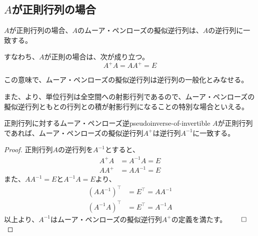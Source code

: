 \documentclass[../../../topic_linear-algebra]{subfiles}
\begin{document}
\subsection{$A$が正則行列の場合}

$A$が正則行列の場合、$A$のムーア・ペンローズの擬似逆行列は、$A$の逆行列に一致する。

すなわち、$A$が正則の場合は、次が成り立つ。
\begin{equation*}
  A^+ A = A A^+ = E
\end{equation*}

この意味で、ムーア・ペンローズの擬似逆行列は逆行列の一般化とみなせる。

\br

また、より、{単位行列は全空間への射影行列}であるので、ムーア・ペンローズの擬似逆行列ともとの行列との積が射影行列になることの特別な場合といえる。

\begin{theorem}{正則行列に対するムーア・ペンローズ逆}{pseudoinverse-of-invertible}
  $A$が正則行列であれば、ムーア・ペンローズの擬似逆行列$A^+$は逆行列$A^{-1}$に一致する。
\end{theorem}

\begin{proof}
  正則行列$A$の逆行列を$A^{-1}$とすると、
  \begin{align*}
    A^+ A &= A^{-1} A = E \\
    A A^+ &= A A^{-1} = E
  \end{align*}
  また、$AA^{-1} = E$と$A^{-1}A = E$より、
  \begin{align*}
    (AA^{-1})^\top & = E^\top = AA^{-1} \\
    (A^{-1}A)^\top & = E^\top = A^{-1}A
  \end{align*}
  以上より、$A^{-1}$はムーア・ペンローズの擬似逆行列$A^+$の定義を満たす。$\qed$
\end{proof}
\end{document}
